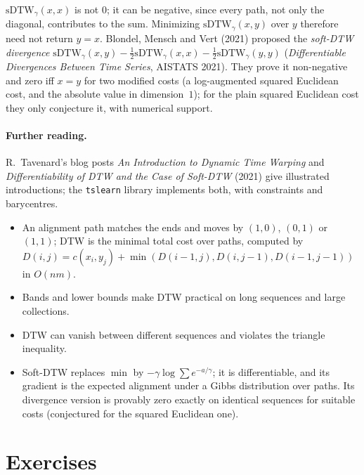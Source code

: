\begin{notechapter}
\begin{pitfall}
$\mathrm{sDTW}_\gamma(x, x)$ is not $0$; it can be negative, since every path, not only the diagonal,
contributes to the sum. Minimizing $\mathrm{sDTW}_\gamma(x, y)$ over $y$ therefore need not return $y = x$.
Blondel, Mensch and Vert (2021) proposed the \emph{soft-DTW divergence}
$\mathrm{sDTW}_\gamma(x, y) - \frac12\mathrm{sDTW}_\gamma(x, x) - \frac12\mathrm{sDTW}_\gamma(y, y)$ (\emph{Differentiable Divergences
Between Time Series}, AISTATS 2021). They prove it non-negative and zero iff $x = y$ for
two modified costs (a log-augmented squared Euclidean cost, and the absolute value in
dimension~$1$); for the plain squared Euclidean cost they only conjecture it, with
numerical support.
\end{pitfall}

\paragraph{Further reading.} R.~Tavenard's blog posts \emph{An Introduction to Dynamic Time
Warping} and \emph{Differentiability of DTW and the Case of Soft-DTW} (2021) give
illustrated introductions; the \texttt{tslearn} library implements both, with
constraints and barycentres.

\begin{chaptersummary}
\begin{itemize}[nosep]
  \item An alignment path matches the ends and moves by $(1, 0)$, $(0, 1)$ or $(1, 1)$; DTW is the minimal
        total cost over paths, computed by $D(i, j) = c(x_i, y_j) + \min(D(i - 1, j), D(i, j - 1), D(i - 1, j - 1))$ in $O(nm)$.
  \item Bands and lower bounds make DTW practical on long sequences and large
        collections.
  \item DTW can vanish between different sequences and violates the triangle inequality.
  \item Soft-DTW replaces $\min$ by $-\gamma\log\sum e^{-a/\gamma}$; it is differentiable, and its gradient is the
        expected alignment under a Gibbs distribution over paths. Its divergence version is
        provably zero exactly on identical sequences for suitable costs (conjectured for the
        squared Euclidean one).
\end{itemize}
\end{chaptersummary}

\section*{Exercises}


\end{notechapter}
